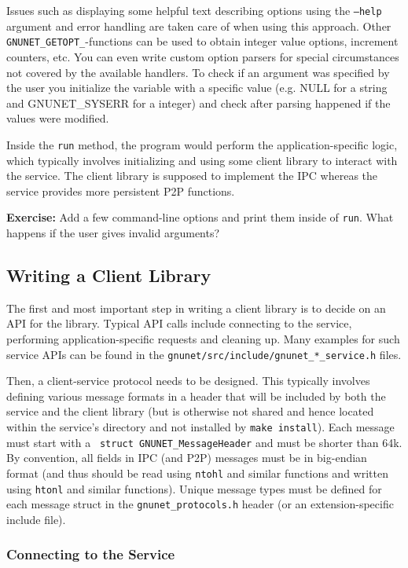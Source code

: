 \documentclass[10pt]{article}
\newcommand{\exercise}[1]{\noindent\begin{boxedminipage}{\textwidth}{\bf Exercise:} #1 \end{boxedminipage}}
\begin{document}
Issues such as displaying some helpful text describing options using
the {\tt --help} argument and error handling are taken care of when
using this approach.  Other {\tt GNUNET\_GETOPT\_}-functions can be used
to obtain integer value options, increment counters, etc.  You can
even write custom option parsers for special circumstances not covered
by the available handlers. To check if an argument was specified by the
user you initialize the variable with a specific value (e.g. NULL for
a string and GNUNET\_SYSERR for a integer) and check after parsing
happened if the values were modified.

Inside the {\tt run} method, the program would perform the
application-specific logic, which typically involves initializing and
using some client library to interact with the service.  The client
library is supposed to implement the IPC whereas the service provides
more persistent P2P functions.

\exercise{Add a few command-line options and print them inside
of {\tt run}.  What happens if the user gives invalid arguments?}

\subsection{Writing a Client Library}

The first and most important step in writing a client library is to
decide on an API for the library.  Typical API calls include
connecting to the service, performing application-specific requests
and cleaning up.  Many examples for such service APIs can be found
in the {\tt gnunet/src/include/gnunet\_*\_service.h} files.

Then, a client-service protocol needs to be designed.  This typically
involves defining various message formats in a header that will be
included by both the service and the client library (but is otherwise
not shared and hence located within the service's directory and not
installed by {\tt make install}).  Each message must start with a {\tt
  struct GNUNET\_MessageHeader} and must be shorter than 64k.  By
convention, all fields in IPC (and P2P) messages must be in big-endian
format (and thus should be read using {\tt ntohl} and similar
functions and written using {\tt htonl} and similar functions).
Unique message types must be defined for each message struct in the
{\tt gnunet\_protocols.h} header (or an extension-specific include
file).

\subsubsection{Connecting to the Service}
\end{document}
